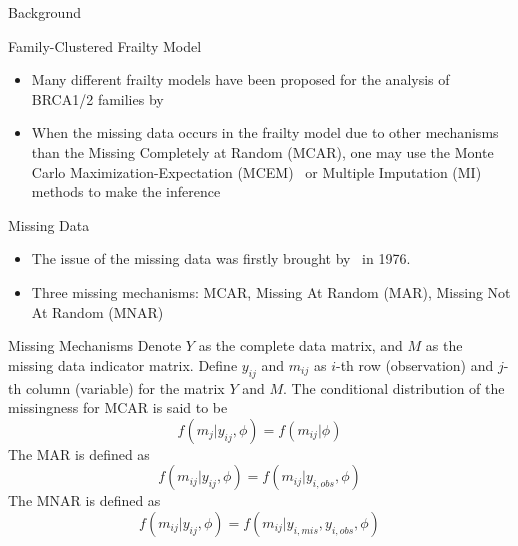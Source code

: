 \documentclass [aspectratio=169]{beamer}
\begin{document}
\begin{frame}{Background}
    \begin{block}{Family-Clustered Frailty Model}
        \begin{itemize}
            \item Many different frailty models have been proposed for the analysis of BRCA1/2 families by~\citet{choi2021competing, chen2009frailty}
            \item When the missing data occurs in the frailty model due to other mechanisms than the Missing Completely at Random (MCAR), one may use the Monte Carlo Maximization-Expectation (MCEM)~\cite{herring2002frailty,herring2002maximum,ibrahim2009missing,ripatti2002maximum} or Multiple Imputation (MI)~\cite{rubin2018multiple} methods to make the inference
        \end{itemize}
    \end{block}
    \begin{block}{Missing Data}
        \begin{itemize}
            \item The issue of the missing data was firstly brought by~\citet{rubin1976inference} in 1976.
            \item Three missing mechanisms: MCAR, Missing At Random (MAR), Missing Not At Random (MNAR)
        \end{itemize}
    \end{block}
\end{frame}

\begin{frame}{Missing Mechanisms}
    Denote $Y$ as the complete data matrix, and $M$ as the missing data indicator matrix. 
    Define $y_{ij}$ and $m_{ij}$ as $i$-th row (observation) and $j$-th column (variable) for the matrix $Y$ and $M$. 
    The conditional distribution of the missingness for MCAR is said to be 
    \begin{equation} 
        f(m_{j}|y_{ij}, \phi)=f(m_{ij}|\phi)
    \end{equation}
    The MAR is defined as 
    \begin{equation} 
        f(m_{ij}|y_{ij},\phi)=f(m_{ij}|y_{i,obs}, \phi)
    \end{equation}
    The MNAR is defined as 
    \begin{equation} 
        f(m_{ij}|y_{ij},\phi)=f(m_{ij}|y_{i,mis}, y_{i,obs}, \phi)
    \end{equation}
\end{frame}
\end{document}
